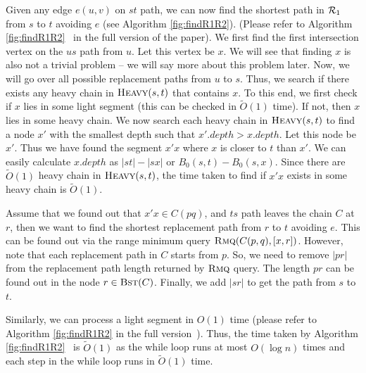 Given any edge $e(u,v)$ on $st$ path, we can now find the shortest path in $\mathcal{R}_1$ from
$s$ to $t$ avoiding $e$
\iflong
(see Algorithm \ref{fig:findR1R2}).
\else
(Please refer to Algorithm \iflong\ref{fig:findR1R2}\fi~ in the full version of the paper).
\fi We first find the first intersection vertex on the
$us$ path from $u$. Let this vertex be $x$. We will see that finding
$x$ is also not a trivial problem --  we will say more about this problem later.
Now, we will go over all  possible replacement paths from $u$ to $s$.
Thus, we  search if there exists any heavy chain in
$\textsc{Heavy}(s,t)$ that contains $x$. To this end, we first check if $x$ lies in some light segment (this can be checked in $\tilde O(1)$ time). If not, then $x$ lies in some heavy chain. We now search each heavy chain in $\textsc{Heavy}(s,t)$ to find a node $x'$ with the smallest depth such that  $x'.depth > x.depth$.
Let this node be $x'$. Thus we have found the segment $x'x$ where $x$ is closer to $t$
than $x'$.
We can easily calculate $x.depth$ as
$|st| - |sx|$ or $B_0(s,t) - B_0(s,x)$. Since there are $\tilde O(1)$ heavy
chain in $\textsc{Heavy}(s,t)$, the time taken to find if $x'x$ exists in some heavy chain is $\tilde O(1)$.

Assume that we found out that
$x'x \in C(pq)$,  and $ts$ path leaves the chain $C$ at $r$, then we want to
find the shortest replacement path from $r$ to $t$ avoiding $e$. This can be found out via the range minimum query $\textsc{Rmq}(C(p,q),[x,r])$.
However, note that each replacement path in $C$ starts from $p$. So, we need to
remove $|pr|$ from the replacement path length returned by $\textsc{Rmq}$ query.
The length $pr$ can be found out in the node $r \in \textsc{Bst}(C)$. Finally, we add $|sr|$ to get the path from $s$ to $t$.

Similarly, we can process a light segment in $O(1)$ time (please refer to Algorithm \iflong\ref{fig:findR1R2} in the full version\fi~).
Thus, the time taken by  Algorithm  \iflong\ref{fig:findR1R2}\fi~ is
$\tilde O(1)$ as the while loop runs at most $O(\log n)$ times  and each step in
the while loop runs in $\tilde O(1)$ time.




